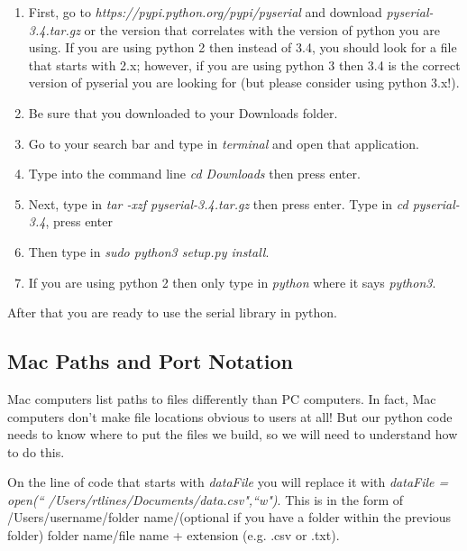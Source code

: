 \begin{enumerate}
\item First, go to \textit{https://pypi.python.org/pypi/pyserial} and
download \textit{pyserial-3.4.tar.gz} or the version that correlates with
the version of python you are using. If you are using python 2 then instead
of 3.4, you should look for a file that starts with 2.x; however, if you are
using python 3 then 3.4 is the correct version of pyserial you are looking
for (but please consider using python 3.x!).

\item Be sure that you downloaded to your Downloads folder.

\item Go to your search bar and type in \textit{terminal} and open that
application.

\item Type into the command line \textit{cd Downloads} then press enter.

\item Next, type in \textit{tar -xzf pyserial-3.4.tar.gz} then press enter.
Type in \textit{cd pyserial-3.4}, press enter

\item Then type in \textit{sudo python3 setup.py install}.

\item If you are using python 2 then only type in \textit{python} where it
says \textit{python3}.
\end{enumerate}

After that you are ready to use the serial library in python.

\subsection{Mac Paths and Port Notation}

Mac computers list paths to files differently than PC computers.
In fact, Mac computers don't make file locations obvious to users at all!
But our python code needs to know where to put the files we build, so we
will need to understand how to do this.

On the line of code that starts with \textit{dataFile} you will replace it
with \textit{dataFile = open(\textquotedblleft
/Users/rtlines/Documents/data.csv",\textquotedblleft w")}. This is in the
form of /Users/username/folder name/(optional if you have a folder within
the previous folder) folder name/file name + extension (e.g. .csv or .txt).

